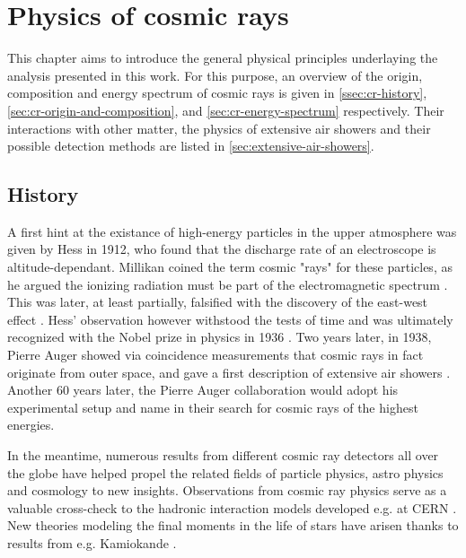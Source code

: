
\chapter{Physics of cosmic rays}
\label{chap:physical-background}

This chapter aims to introduce the general physical principles underlaying the analysis presented in this work. For this purpose, an overview of the origin, 
composition and energy spectrum of cosmic rays is given in \autoref{ssec:cr-history}, \autoref{sec:cr-origin-and-composition}, and \autoref{sec:cr-energy-spectrum}
respectively. Their interactions with other matter, the physics of extensive air showers and their possible detection methods are listed in 
\autoref{sec:extensive-air-showers}.

\section{History}
\label{ssec:cr-history}

A first hint at the existance of high-energy particles in the upper atmosphere was given by Hess in 1912, who found that the discharge rate of an electroscope is 
altitude-dependant. Millikan coined the term cosmic "rays" for these particles, as he argued the ionizing radiation must be part of the electromagnetic spectrum 
\cite{millikan1928origin}. This was later, at least partially, falsified with the discovery of the east-west effect \cite{johnson1938note}. Hess' observation 
however withstood the tests of time and was ultimately recognized with the Nobel prize in physics in 1936 \cite{nobelprize1936}. Two years later, in 1938, Pierre 
Auger showed via coincidence measurements that cosmic rays in fact originate from outer space, and gave a first description of extensive air showers 
\cite{auger1939extensive}. Another 60 years later, the Pierre Auger collaboration would adopt his experimental setup and name in their search for cosmic rays of 
the highest energies.

In the meantime, numerous results from different cosmic ray detectors all over the globe have helped propel the related fields of particle physics, astro physics 
and cosmology to new insights. Observations from cosmic ray physics serve as a valuable cross-check to the hadronic interaction models developed e.g. at CERN 
\cite{ostapchenko2007status}. New theories modeling the final moments in the life of stars have arisen thanks to results from e.g. Kamiokande 
\cite{goldman1988implications}. 


